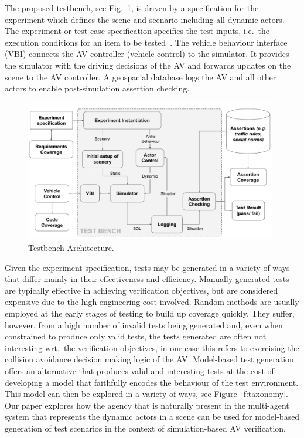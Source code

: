 \documentclass[runningheads,a4paper]{llncs}
\begin{document}
The proposed testbench, see Fig.~\ref{f:testbench}, is driven by a specification for the experiment which defines the scene and scenario including all dynamic actors. 
%
The experiment or test case specification specifies the test inputs, i.e.\ the execution conditions for an item to be tested~\cite{StandardsBoard1990}.
%
The vehicle behaviour interface (VBI) connects the AV controller (vehicle control) to the simulator. It provides the simulator with the driving decisions of the AV and forwards updates on the scene to the AV controller. 
%
A geospacial database logs the AV and all other actors to enable post-simulation assertion checking. 


\begin{figure}[!t]
	\centering
\includegraphics[width=0.98\textwidth]{TestBenchMonotone.pdf}
	\caption{Testbench Architecture.}
	\label{f:testbench}
\end{figure}

%
Given the experiment specification, tests may be generated in a variety of ways that differ mainly in their effectiveness and efficiency. 
%
Manually generated tests are typically effective in achieving verification objectives, but are considered expensive due to the high engineering cost involved. 
%
Random methods are usually employed at the early stages of testing to build up coverage quickly. They suffer, however, from a high number of invalid tests being generated and, even when constrained to produce only valid tests, the tests generated are often not interesting wrt.\ the verification objectives, in our case this refers to exercising the collision avoidance decision making logic of the AV. 
%
Model-based test generation offers an alternative that produces valid and interesting tests at the cost of developing a model that faithfully encodes the behaviour of the test environment. This model can then be explored in a variety of ways, see Figure~\ref{f:taxonomy}.
%
Our paper explores how the agency that is naturally present in the multi-agent system that represents the dynamic actors in a scene can be used for model-based generation of test scenarios in the context of simulation-based AV verification. 
\end{document}
